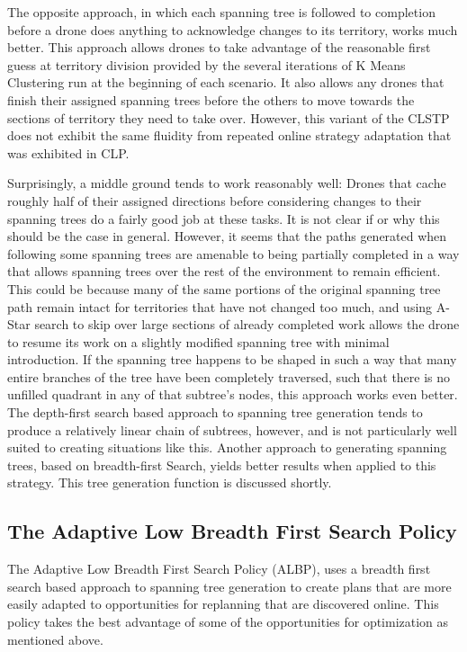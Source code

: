 The opposite approach, in which each spanning tree is followed to completion before a drone does anything to acknowledge changes to its territory, works much better. This approach allows drones to take advantage of the reasonable first guess at territory division provided by the several iterations of K Means Clustering run at the beginning of each scenario. It also allows any drones that finish their assigned spanning trees before the others to move towards the sections of territory they need to take over. However, this variant of the CLSTP does not exhibit the same fluidity from repeated online strategy adaptation that was exhibited in CLP.

Surprisingly, a middle ground tends to work reasonably well: Drones that cache roughly half of their assigned directions before considering changes to their spanning trees do a fairly good job at these tasks. It is not clear if or why this should be the case in general. However, it seems that the paths generated when following some spanning trees are amenable to being partially completed in a way that allows spanning trees over the rest of the environment to remain efficient. This could be because many of the same portions of the original spanning tree path remain intact for territories that have not changed too much, and using A-Star search to skip over large sections of already completed work allows the drone to resume its work on a slightly modified spanning tree with minimal introduction. If the spanning tree happens to be shaped in such a way that many entire branches of the tree have been completely traversed, such that there is no unfilled quadrant in any of that subtree's nodes, this approach works even better. The depth-first search based approach to spanning tree generation tends to produce a relatively linear chain of subtrees, however, and is not particularly well suited to creating situations like this. Another approach to generating spanning trees, based on breadth-first Search, yields better results when applied to this strategy. This tree generation function is discussed shortly.

\subsection{The Adaptive Low Breadth First Search Policy}

The Adaptive Low Breadth First Search Policy (ALBP), uses a breadth first search based approach to spanning tree generation to create plans that are more easily adapted to opportunities for replanning that are discovered online.
This policy takes the best advantage of some of the opportunities for optimization as mentioned above.

